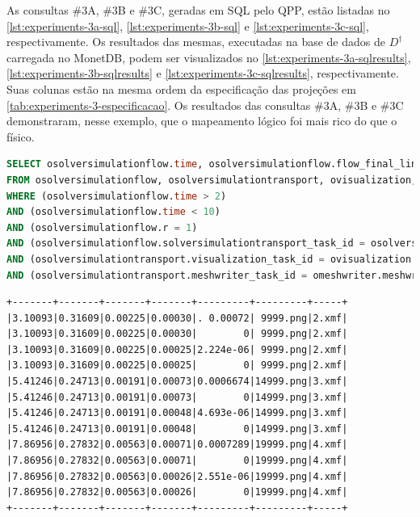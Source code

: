 As consultas \#3A, \#3B e \#3C, geradas em SQL pelo QPP, estão listadas no \autoref{lst:experiments-3a-sql}, \autoref{lst:experiments-3b-sql} e \autoref{lst:experiments-3c-sql}, respectivamente. Os resultados das mesmas, executadas na base de dados de \(D^{\dagger}\) carregada no MonetDB, podem ser visualizados no \autoref{lst:experiments-3a-sqlresults}, \autoref{lst:experiments-3b-sqlresults} e \autoref{lst:experiments-3c-sqlresults}, respectivamente. Suas colunas estão na mesma ordem da especificação das projeções em \autoref{tab:experiments-3-especificacao}. Os resultados das consultas \#3A, \#3B e \#3C demonstraram, nesse exemplo, que o mapeamento lógico foi mais rico do que o físico.

\begin{lstlisting}[language=sql,deletendkeywords={TIME},deletendkeywords={TIME},label={lst:experiments-3a-sql},caption={[Código em SQL gerado na consulta~\#3A]Código em SQL gerado na consulta~\#3A. Tempo médio de geração: 31,80~ms.}]
SELECT osolversimulationflow.time, osolversimulationflow.flow_final_linear_residual, osolversimulationflow.flow_norm_delta_u, osolversimulationtransport.transport_final_linear_residual, osolversimulationtransport.transport_norm_delta_u, ovisualization.png, omeshwriter.xdmf
FROM osolversimulationflow, osolversimulationtransport, ovisualization, omeshwriter
WHERE (osolversimulationflow.time > 2) 
AND (osolversimulationflow.time < 10) 
AND (osolversimulationflow.r = 1) 
AND (osolversimulationflow.solversimulationtransport_task_id = osolversimulationtransport.solversimulationtransport_task_id) 
AND (osolversimulationtransport.visualization_task_id = ovisualization.visualization_task_id) 
AND (osolversimulationtransport.meshwriter_task_id = omeshwriter.meshwriter_task_id);
\end{lstlisting}

\begin{lstlisting}[language=sqlresults,label={lst:experiments-3a-sqlresults},caption={[Versão simplificada dos resultados da consulta \#3A.]Resultados da consulta \#3A. Tempo médio de execução: 5,11~ms.}]
+-------+-------+-------+-------+---------+---------+-----+
|3.10093|0.31609|0.00225|0.00030|. 0.00072| 9999.png|2.xmf|
|3.10093|0.31609|0.00225|0.00030|        0| 9999.png|2.xmf|
|3.10093|0.31609|0.00225|0.00025|2.224e-06| 9999.png|2.xmf|
|3.10093|0.31609|0.00225|0.00025|        0| 9999.png|2.xmf|
|5.41246|0.24713|0.00191|0.00073|0.0006674|14999.png|3.xmf|
|5.41246|0.24713|0.00191|0.00073|        0|14999.png|3.xmf|
|5.41246|0.24713|0.00191|0.00048|4.693e-06|14999.png|3.xmf|
|5.41246|0.24713|0.00191|0.00048|        0|14999.png|3.xmf|
|7.86956|0.27832|0.00563|0.00071|0.0007289|19999.png|4.xmf|
|7.86956|0.27832|0.00563|0.00071|        0|19999.png|4.xmf|
|7.86956|0.27832|0.00563|0.00026|2.551e-06|19999.png|4.xmf|
|7.86956|0.27832|0.00563|0.00026|        0|19999.png|4.xmf|
+-------+-------+-------+-------+---------+---------+-----+
\end{lstlisting}


